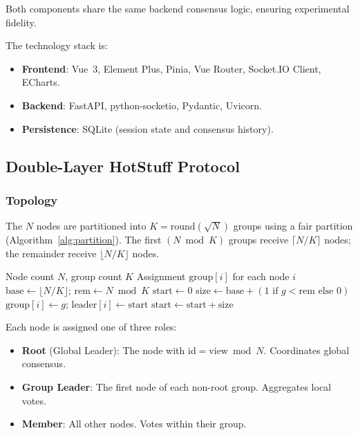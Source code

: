 \documentclass[
12pt,
oneside,
singlespacing,
parskip,
]{article}
\begin{document}
Both components share the same backend consensus logic, ensuring experimental fidelity.

The technology stack is:
\begin{itemize}
  \item \textbf{Frontend}: Vue~3, Element Plus, Pinia, Vue Router, Socket.IO Client, ECharts.
  \item \textbf{Backend}: FastAPI, python-socketio, Pydantic, Uvicorn.
  \item \textbf{Persistence}: SQLite (session state and consensus history).
\end{itemize}

\subsection{Double-Layer HotStuff Protocol}

\subsubsection{Topology}

The $N$ nodes are partitioned into $K = \mathrm{round}(\sqrt{N})$ groups using a fair partition (Algorithm~\ref{alg:partition}). The first $(N \bmod K)$ groups receive $\lceil N/K \rceil$ nodes; the remainder receive $\lfloor N/K \rfloor$ nodes.

\begin{algorithm}[H]
\caption{Fair group partition}
\label{alg:partition}
\begin{algorithmic}[1]
\Require Node count $N$, group count $K$
\Ensure Assignment $\mathrm{group}[i]$ for each node $i$
\State $\mathrm{base} \leftarrow \lfloor N/K \rfloor$; $\mathrm{rem} \leftarrow N \bmod K$
\State $\mathrm{start} \leftarrow 0$
    \State $\mathrm{size} \leftarrow \mathrm{base} + (1 \text{ if } g < \mathrm{rem} \text{ else } 0)$
        \State $\mathrm{group}[i] \leftarrow g$; $\mathrm{leader}[i] \leftarrow \mathrm{start}$
    \EndFor
    \State $\mathrm{start} \leftarrow \mathrm{start} + \mathrm{size}$
\EndFor
\end{algorithmic}
\end{algorithm}

Each node is assigned one of three roles:
\begin{itemize}
  \item \textbf{Root} (Global Leader): The node with $\mathrm{id} = \mathrm{view} \bmod N$. Coordinates global consensus.
  \item \textbf{Group Leader}: The first node of each non-root group. Aggregates local votes.
  \item \textbf{Member}: All other nodes. Votes within their group.
\end{itemize}
\end{document}
